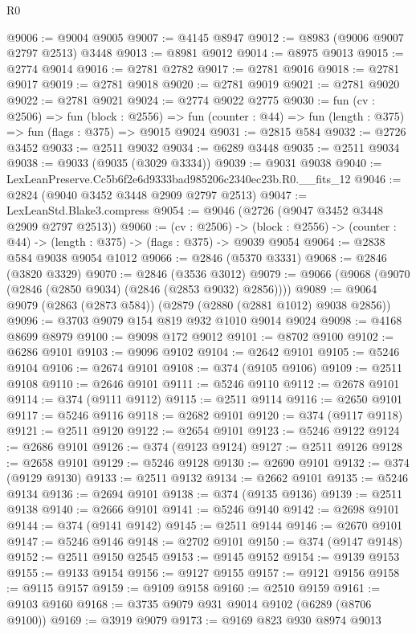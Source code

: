 \begin{lexlean}{R0}
\begin{coremodule}
@9006 := @9004 @9005
@9007 := @4145 @8947
@9012 := @8983 (@9006 @9007 @2797 @2513) @3448
@9013 := @8981 @9012
@9014 := @8975 @9013
@9015 := @2774 @9014
@9016 := @2781 @2782
@9017 := @2781 @9016
@9018 := @2781 @9017
@9019 := @2781 @9018
@9020 := @2781 @9019
@9021 := @2781 @9020
@9022 := @2781 @9021
@9024 := @2774 @9022 @2775
@9030 := fun (cv : @2506) =>
  fun (block : @2556) =>
  fun (counter : @44) => fun (length : @375) => fun (flags : @375) => @9015 @9024
@9031 := @2815 @584
@9032 := @2726 @3452
@9033 := @2511 @9032
@9034 := @6289 @3448
@9035 := @2511 @9034
@9038 := @9033 (@9035 (@3029 @3334))
@9039 := @9031 @9038
@9040 := LexLeanPreserve.Cc5b6f2e6d9333bad985206c2340ec23b.R0.__fits_12
@9046 := @2824 (@9040 @3452 @3448 @2909 @2797 @2513)
@9047 := LexLeanStd.Blake3.compress
@9054 := @9046 (@2726 (@9047 @3452 @3448 @2909 @2797 @2513))
@9060 := (cv : @2506) ->
  (block : @2556) -> (counter : @44) -> (length : @375) -> (flags : @375) -> @9039 @9054
@9064 := @2838 @584 @9038 @9054 @1012
@9066 := @2846 (@5370 @3331)
@9068 := @2846 (@3820 @3329)
@9070 := @2846 (@3536 @3012)
@9079 := @9066 (@9068 (@9070 (@2846 (@2850 @9034) (@2846 (@2853 @9032) @2856))))
@9089 := @9064 @9079 (@2863 (@2873 @584)) (@2879 (@2880 (@2881 @1012) @9038 @2856))
@9096 := @3703 @9079 @154 @819 @932 @1010 @9014 @9024
@9098 := @4168 @8699 @8979
@9100 := @9098 @172 @9012
@9101 := @8702 @9100
@9102 := @6286 @9101
@9103 := @9096 @9102
@9104 := @2642 @9101
@9105 := @5246 @9104
@9106 := @2674 @9101
@9108 := @374 (@9105 @9106)
@9109 := @2511 @9108
@9110 := @2646 @9101
@9111 := @5246 @9110
@9112 := @2678 @9101
@9114 := @374 (@9111 @9112)
@9115 := @2511 @9114
@9116 := @2650 @9101
@9117 := @5246 @9116
@9118 := @2682 @9101
@9120 := @374 (@9117 @9118)
@9121 := @2511 @9120
@9122 := @2654 @9101
@9123 := @5246 @9122
@9124 := @2686 @9101
@9126 := @374 (@9123 @9124)
@9127 := @2511 @9126
@9128 := @2658 @9101
@9129 := @5246 @9128
@9130 := @2690 @9101
@9132 := @374 (@9129 @9130)
@9133 := @2511 @9132
@9134 := @2662 @9101
@9135 := @5246 @9134
@9136 := @2694 @9101
@9138 := @374 (@9135 @9136)
@9139 := @2511 @9138
@9140 := @2666 @9101
@9141 := @5246 @9140
@9142 := @2698 @9101
@9144 := @374 (@9141 @9142)
@9145 := @2511 @9144
@9146 := @2670 @9101
@9147 := @5246 @9146
@9148 := @2702 @9101
@9150 := @374 (@9147 @9148)
@9152 := @2511 @9150 @2545
@9153 := @9145 @9152
@9154 := @9139 @9153
@9155 := @9133 @9154
@9156 := @9127 @9155
@9157 := @9121 @9156
@9158 := @9115 @9157
@9159 := @9109 @9158
@9160 := @2510 @9159
@9161 := @9103 @9160
@9168 := @3735 @9079 @931 @9014 @9102 (@6289 (@8706 @9100))
@9169 := @3919 @9079
@9173 := @9169 @823 @930 @8974 @9013

\end{coremodule}
\end{lexlean}

